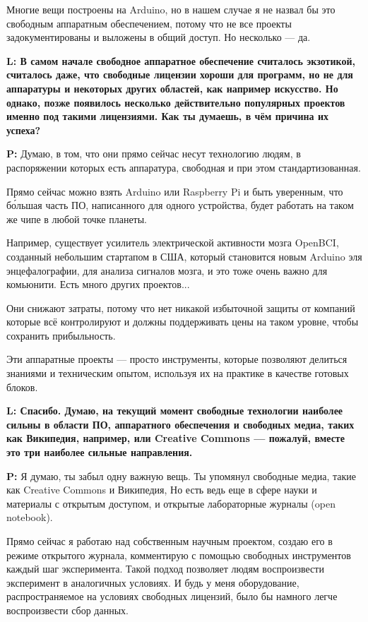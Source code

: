 \documentclass[10pt, a5paper]{article}
\begin{document}
\begin{Parallel}[p]{}{}
{Многие вещи построены на Arduino, но в нашем случае я не назвал бы это свободным аппаратным обеспечением, потому что не все проекты задокументированы и выложены в общий доступ. Но несколько --- да.

{\noindent \bf L: В самом начале свободное аппаратное обеспечение считалось экзотикой, считалось даже, что свободные лицензии хороши для программ, но не для аппаратуры и некоторых других областей, как например искусство. Но однако, позже появилось несколько действительно популярных проектов именно под такими лицензиями. Как ты думаешь, в чём причина их успеха?}

{\noindent \bf P:} Думаю, в том, что они прямо сейчас несут технологию людям, в распоряжении которых есть аппаратура, свободная и при этом стандартизованная.

Прямо сейчас можно взять Arduino или Raspberry Pi и быть уверенным, что б\'{о}льшая часть ПО, написанного для одного устройства, будет работать на таком же чипе в любой точке планеты. 

Например, существует усилитель электрической активности мозга OpenBCI, созданный небольшим стартапом в США, который становится новым Arduino эля энцефалографии, для анализа сигналов мозга, и это тоже очень важно для комьюнити. Есть много других проектов...

Они снижают затраты, потому что нет никакой избыточной защиты от компаний которые всё контролируют и должны поддерживать цены на таком уровне, чтобы сохранить прибыльность. 

Эти аппаратные проекты --- просто инструменты, которые позволяют делиться знаниями и техническим опытом, используя их на практике в качестве готовых блоков.

{\noindent \bf L: Спасибо. 
Думаю, на текущий момент свободные технологии наиболее сильны в области ПО, аппаратного обеспечения и свободных медиа, таких как Википедия, например, или Creative Commons --- пожалуй, вместе это три наиболее сильные направления.}

{\noindent \bf P:} Я думаю, ты забыл одну важную вещь. Ты упомянул свободные медиа, такие как Creative Commons и Википедия, Но есть ведь еще в сфере науки и материалы с открытым доступом, и открытые лабораторные журналы (open notebook). 

Прямо сейчас я работаю над собственным научным проектом, создаю его в режиме открытого журнала, комментирую с помощью свободных инструментов каждый шаг эксперимента. Такой подход позволяет людям воспроизвести эксперимент в аналогичных условиях. И будь у меня оборудование, распространяемое на условиях свободных лицензий, было бы намного легче воспроизвести сбор данных.

}
\end{Parallel}
\end{document}
